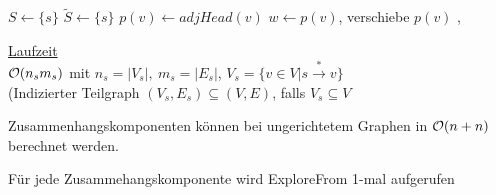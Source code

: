         \begin{algorithmic}
        		\State $S\gets \{s\}$
        		\State $\tilde S \gets \{s\}$
        			\State $p(v)\gets adjHead(v)$
        		\EndFor
        			\State $w\gets p(v)$, verschiebe $p(v)$
        				\State{}, 
        			\Else
        				\State {}
        			\EndIf
        		\EndWhile
        	\EndFunction
        \end{algorithmic}


					\underline{Laufzeit}\\
					$\mathcal{O} (n_s m_s)$ mit $n_s=|V_s|,\ m_s=|E_s|$, $V_s=\{v\in V|s\overset{*}{\rightarrow} v\}$\\
					(Indizierter Teilgraph $(V_s,E_s)\subseteq (V,E)$, falls $V_s\subseteq V$
					
					\begin{satz}
						Zusammenhangskomponenten können bei ungerichtetem Graphen in $\mathcal{O} (n+n)$ berechnet werden.
					\end{satz}
					
%
					\begin{algorithmic}
								\State {}
							\EndIf
						\EndFor				
					\end{algorithmic}
					Für jede Zusammehangskomponente wird ExploreFrom 1-mal aufgerufen
										
